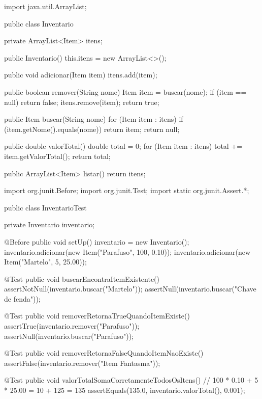 \documentclass[11pt,a4paper]{article}
\begin{document}
\begin{javacode}
import java.util.ArrayList;

public class Inventario {
    private ArrayList<Item> itens;

    public Inventario() {
        this.itens = new ArrayList<>();
    }

    public void adicionar(Item item) {
        itens.add(item);
    }

    public boolean remover(String nome) {
        Item item = buscar(nome);
        if (item == null) {
            return false;
        }
        itens.remove(item);
        return true;
    }

    public Item buscar(String nome) {
        for (Item item : itens) {
            if (item.getNome().equals(nome)) {
                return item;
            }
        }
        return null;
    }

    public double valorTotal() {
        double total = 0;
        for (Item item : itens) {
            total += item.getValorTotal();
        }
        return total;
    }

    public ArrayList<Item> listar() {
        return itens;
    }
}
\end{javacode}

\begin{javacode}
import org.junit.Before;
import org.junit.Test;
import static org.junit.Assert.*;

public class InventarioTest {

    private Inventario inventario;

    @Before
    public void setUp() {
        inventario = new Inventario();
        inventario.adicionar(new Item("Parafuso", 100, 0.10));
        inventario.adicionar(new Item("Martelo", 5, 25.00));
    }

    @Test
    public void buscarEncontraItemExistente() {
        assertNotNull(inventario.buscar("Martelo"));
        assertNull(inventario.buscar("Chave de fenda"));
    }

    @Test
    public void removerRetornaTrueQuandoItemExiste() {
        assertTrue(inventario.remover("Parafuso"));
        assertNull(inventario.buscar("Parafuso"));
    }

    @Test
    public void removerRetornaFalseQuandoItemNaoExiste() {
        assertFalse(inventario.remover("Item Fantasma"));
    }

    @Test
    public void valorTotalSomaCorretamenteTodosOsItens() {
        // 100 * 0.10 + 5 * 25.00 = 10 + 125 = 135
        assertEquals(135.0, inventario.valorTotal(), 0.001);
    }
}
\end{javacode}
\end{document}
